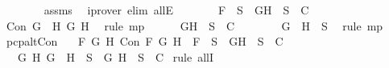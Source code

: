 \begin{isabellebody}
\ \ \ \ \ \ \isamarkupfalse%
\ assms\ \isamarkupfalse%
\ {\isacharparenleft}iprover\ elim{\isacharcolon}\ allE{\isacharparenright}\isanewline
\ \ \ \ \isamarkupfalse%
\ \isamarkupfalse%
\ {\isachardoublequoteopen}{\isacharquery}F\ {\isasymin}\ S\ {\isasymlongrightarrow}\ {\isacharbraceleft}\isactrlbold {\isasymnot}G{\isacharcomma}\isactrlbold {\isasymnot}H{\isacharbraceright}\ {\isasymunion}\ S\ {\isasymin}\ C{\isachardoublequoteclose}\isanewline
\ \ \ \ \ \ \isamarkupfalse%
\ {\isacartoucheopen}Con\ {\isacharparenleft}\isactrlbold {\isasymnot}{\isacharparenleft}G\ \isactrlbold {\isasymor}\ H{\isacharparenright}{\isacharparenright}\ {\isacharparenleft}\isactrlbold {\isasymnot}G{\isacharparenright}\ {\isacharparenleft}\isactrlbold {\isasymnot}H{\isacharparenright}{\isacartoucheclose}\ \isamarkupfalse%
\ {\isacharparenleft}rule\ mp{\isacharparenright}\isanewline
\ \ \ \ \isamarkupfalse%
\ {\isachardoublequoteopen}{\isacharbraceleft}\isactrlbold {\isasymnot}G{\isacharcomma}\isactrlbold {\isasymnot}H{\isacharbraceright}\ {\isasymunion}\ S\ {\isasymin}\ C{\isachardoublequoteclose}\isanewline
\ \ \ \ \ \ \isamarkupfalse%
\ {\isacartoucheopen}\isactrlbold {\isasymnot}{\isacharparenleft}G\ \isactrlbold {\isasymor}\ H{\isacharparenright}\ {\isasymin}\ S{\isacartoucheclose}\ \isamarkupfalse%
\ {\isacharparenleft}rule\ mp{\isacharparenright}\isanewline
\ \ \isamarkupfalse%
\isanewline
{}\isamarkupfalse%
%
\endisatagproof
{\isafoldproof}%
%
\isadelimproof
\isanewline
%
\endisadelimproof
\isanewline
{}\isamarkupfalse%
\ pcp{\isacharunderscore}alt{}Con{}{\isacharcolon}\isanewline
\ \ \ {\isachardoublequoteopen}{\isasymforall}F\ G\ H{\isachardot}\ Con\ F\ G\ H\ {\isasymlongrightarrow}\ F\ {\isasymin}\ S\ {\isasymlongrightarrow}\ {\isacharbraceleft}G{\isacharcomma}H{\isacharbraceright}\ {\isasymunion}\ S\ {\isasymin}\ C{\isachardoublequoteclose}\isanewline
\ \ \ {\isachardoublequoteopen}{\isasymforall}G\ H{\isachardot}\ \isactrlbold {\isasymnot}{\isacharparenleft}G\ \isactrlbold {\isasymrightarrow}\ H{\isacharparenright}\ {\isasymin}\ S\ {\isasymlongrightarrow}\ {\isacharbraceleft}G{\isacharcomma}\isactrlbold {\isasymnot}\ H{\isacharbraceright}\ {\isasymunion}\ S\ {\isasymin}\ C{\isachardoublequoteclose}\isanewline
%
\isadelimproof
%
\endisadelimproof
%
\isatagproof
{}\isamarkupfalse%
\ {\isacharparenleft}rule\ allI{\isacharparenright}{\isacharplus}\isanewline

\end{isabellebody}
